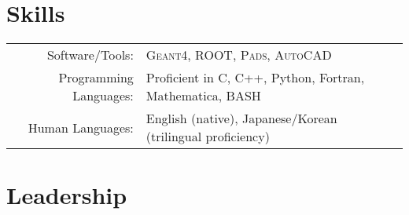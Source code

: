 \documentclass[10pt]{article} %
\begin{document}

\section{Skills}

\noindent\begin{tabularx}{\linewidth}{@{}rl}
	Software/Tools: & \textsc{Geant4}, \textsc{ROOT}, \textsc{Pads}, \textsc{AutoCAD}\\
	Programming Languages: & Proficient in C, C++, Python, Fortran, Mathematica, BASH\\
	Human Languages: & English (native), Japanese/Korean (trilingual proficiency)\\
\end{tabularx}


\section{Leadership}
\end{document}
